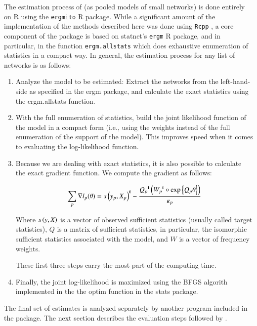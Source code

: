 \documentclass[review]{elsarticle}
\begin{document}
The estimation process of \ergmitos{} (as pooled models of small networks) is done entirely on R using the \texttt{ergmito} R package. While a significant amount of the implementation of the methods described here was done using \texttt{Rcpp} \cite{Eddelbuettel2011}, a core component of the package is based on statnet's \texttt{ergm} R package, and in particular, in the function \texttt{ergm.allstats} which does exhaustive enumeration of statistics in a compact way. In general, the estimation process for any list of networks is as follows:

\begin{enumerate}
    \item Analyze the model to be estimated: Extract the networks from the left-hand-side as specified in the ergm package, and calculate the exact statistics using the ergm.allstats function.
    \item With the full enumeration of statistics, build the joint likelihood function of the model in a compact form (i.e., using the weights instead of the full enumeration of the support of the model). This improves speed when it comes to evaluating the log-likelihood function.
    \item Because we are dealing with exact statistics, it is also possible to calculate the exact gradient function. We compute the gradient as follows:
    
    \begin{equation}
    \sum_{p}\nabla l_p(\theta) = {s\left(y_p, X_p\right)}^\mathbf{t} - \frac{{Q_p}^\mathbf{t}\left({W_p}^\mathbf{t} \circ \mbox{exp}\left\{Q_p \theta\right\}\right)}{\kappa_p}
    \end{equation}
    
    Where $s\left(y, X\right)$ is a vector of observed sufficient statistics (usually called target statistics), $Q$ is a matrix of sufficient statistics, in particular, the isomorphic sufficient statistics associated with the model, and $W$ is a vector of frequency weights.
    
    These first three steps carry the most part of the computing time.
    
    \item Finally, the joint log-likelihood is maximized using the BFGS algorith implemented in the the optim function in the stats package.
    
\end{enumerate}

The final set of estimates is analyzed separately by another program included in the package. The next section describes the evaluation steps followed by \ergmito{}.
\end{document}
